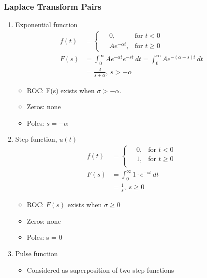 \documentclass[a4paper]{article}
\begin{document}
\subsubsection{Laplace Transform Pairs}
\begin{enumerate}[label=\alph*.]
    \item Exponential function
    \begin{align*}
        f(t) &= \begin{cases}
        \quad 0, & \text{for }t<0\\
        \quad Ae^{-\alpha t}, & \text{for }t\geq 0
        \end{cases}\\
        F(s) &= \int_0^\infty Ae^{-\alpha t}e^{-st}\ dt = \int_0^\infty Ae^{-(\alpha +s)t}\ dt\\
        &= \frac{A}{s+\alpha},\ s > -\alpha
    \end{align*}
    \begin{itemize}
        \item ROC: F(s) exists when $\sigma > -\alpha.$
        \item Zeros: none
        \item Poles: $s = -\alpha$
    \end{itemize}
    \item Step function, $u(t)$
    \begin{align*}
        f(t) &= \begin{cases}
        \quad 0, & \text{for }t<0\\
        \quad 1, & \text{for }t\geq 0\\
        \end{cases}\\
        F(s) &= \int_0^\infty 1\cdot e^{-st}\ dt\\
        &= \frac{1}{s},\ s\geq 0
    \end{align*}
    \begin{itemize}
        \item ROC: $F(s)$ exists when $\sigma \geq 0$
        \item Zeros: none
        \item Poles: s = 0
    \end{itemize}
    \item Pulse function
    \begin{itemize}
        \item Considered as superposition of two step functions
    \end{itemize}
    \begin{align*}

\end{align*}
\end{enumerate}
\end{document}

